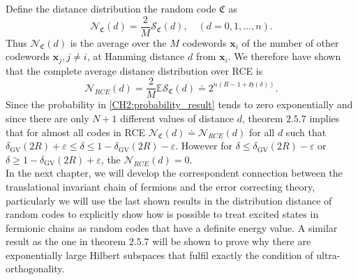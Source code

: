 \indent Define the distance distribution the random code $\mathfrak{C}$ as
\begin{equation}
\mathcal{N}_{\mathfrak{C}}(d)  = \frac{2}{M} \mathcal{S}_{\mathfrak{C}}(d), \quad  (d=0,1,\ldots , n).
\end{equation}
Thus $\mathcal{N}_{\mathfrak{C}}(d)$ is the average over the $M$ codewords $\mathbf{x}_i$ of the number of other codewords $\mathbf{x}_j, j \neq i$, at Hamming distance $d$ from $\mathbf{x}_i$.
\indent We therefore have shown that the complete average distance distribution over RCE is
\begin{equation}
\mathcal{N}_{RCE}(d)  = \frac{2}{M} \mathbb{E} \mathcal{S}_{\mathfrak{C}}(d) \doteq 2^{n(R-1+\mathfrak{H}(\delta))}.
\end{equation}
Since the probability in \eqref{CH2:probability_result} tends to zero exponentially and since there are only $N+1$ different values of distance $d$, theorem $2.5.7$ implies that for almost all codes in RCE $\mathcal{N}_{\mathfrak{C}}(d) \doteq \mathcal{N}_{RCE}(d)$ for all $d$ such that $\delta_{\mathrm{GV}}(2 R)+\varepsilon \leq \delta \leq 1-\delta_{\mathrm{GV}}(2 R)-\varepsilon$. However for $\delta \leq \delta_{\mathrm{GV}}(2 R)-\varepsilon$ or $\delta \geq 1-\delta_{\mathrm{GV}}(2 R)+\varepsilon$, the $\mathcal{N}_{RCE}(d)=0$.\\


In the next chapter, we will develop the correspondent connection between the translational invariant chain of fermions and the error correcting theory, particularly we will use the last shown results in the distribution distance of random codes to explicitly show how is possible to treat excited states in fermionic chains as random codes that have a definite energy value. A similar result as the one in theorem $2.5.7$ will be shown to prove why there are exponentially large Hilbert subspaces that fulfil exactly the condition of ultra-orthogonality.